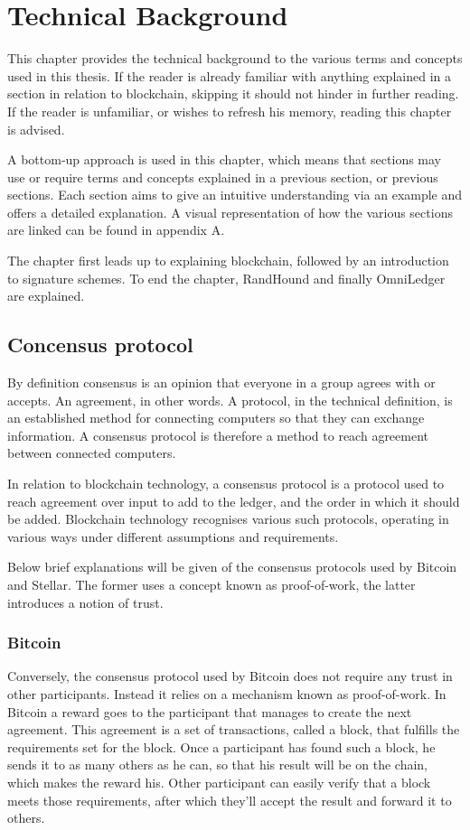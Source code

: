 \documentclass[12pt]{report}
\theoremstyle{plain}
\theoremstyle{definition}
\begin{document}
	\chapter{Technical Background}
	This chapter provides the technical background to the various terms and concepts used in this thesis. If the reader is already familiar with anything explained in a section in relation to blockchain, skipping it should not hinder in further reading. If the reader is unfamiliar, or wishes to refresh his memory, reading this chapter is advised.
	
	A bottom-up approach is used in this chapter, which means that sections may use or require terms and concepts explained in a previous section, or previous sections. Each section aims to give an intuitive understanding via an example and offers a detailed explanation. A visual representation of how the various sections are linked can be found in appendix A.
	
	The chapter first leads up to explaining blockchain, followed by an introduction to signature schemes. To end the chapter, RandHound and finally OmniLedger are explained.
	
	\section{Concensus protocol}
	By definition consensus is an opinion that everyone in a group agrees with or accepts. An agreement, in other words. A protocol, in the technical definition, is an established method for connecting computers so that they can exchange information. A consensus protocol is therefore a method to reach agreement between connected computers.
	
	In relation to blockchain technology, a consensus protocol\cite{ibmconsensus} is a protocol used to reach agreement over input to add to the ledger, and the order in which it should be added. Blockchain technology recognises various such protocols, operating in various ways under different assumptions and requirements.
	
	Below brief explanations will be given of the consensus protocols used by Bitcoin and Stellar. The former uses a concept known as proof-of-work, the latter introduces a notion of trust.
	
	\subsection{Bitcoin}
	Conversely, the consensus protocol used by Bitcoin\cite{bitcoinconsensus} does not require any trust in other participants. Instead it relies on a mechanism known as proof-of-work. In Bitcoin a reward goes to the participant that manages to create the next agreement. This agreement is a set of transactions, called a block, that fulfills the requirements set for the block. Once a participant has found such a block, he sends it to as many others as he can, so that his result will be on the chain, which makes the reward his. Other participant can easily verify that a block meets those requirements, after which they'll accept the result and forward it to others.
	
\end{document}
